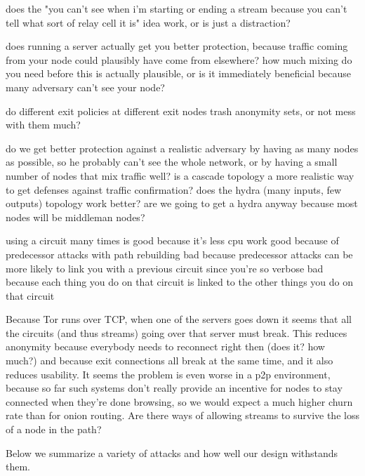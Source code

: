\documentclass[times,10pt,twocolumn]{article}
\begin{document}
does the "you can't see when i'm starting or ending a stream because
you can't tell what sort of relay cell it is" idea work, or is just
a distraction?

does running a server actually get you better protection, because traffic
coming from your node could plausibly have come from elsewhere? how
much mixing do you need before this is actually plausible, or is it
immediately beneficial because many adversary can't see your node?

do different exit policies at different exit nodes trash anonymity sets,
or not mess with them much?

do we get better protection against a realistic adversary by having as
many nodes as possible, so he probably can't see the whole network,
or by having a small number of nodes that mix traffic well? is a
cascade topology a more realistic way to get defenses against traffic
confirmation? does the hydra (many inputs, few outputs) topology work
better? are we going to get a hydra anyway because most nodes will be
middleman nodes?

using a circuit many times is good because it's less cpu work
  good because of predecessor attacks with path rebuilding
  bad because predecessor attacks can be more likely to link you with a
    previous circuit since you're so verbose
  bad because each thing you do on that circuit is linked to the other
    things you do on that circuit

Because Tor runs over TCP, when one of the servers goes down it seems
that all the circuits (and thus streams) going over that server must
break. This reduces anonymity because everybody needs to reconnect
right then (does it? how much?) and because exit connections all break
at the same time, and it also reduces usability. It seems the problem
is even worse in a p2p environment, because so far such systems don't
really provide an incentive for nodes to stay connected when they're
done browsing, so we would expect a much higher churn rate than for
onion routing. Are there ways of allowing streams to survive the loss
of a node in the path?



\label{sec:attacks}

Below we summarize a variety of attacks and how well our design withstands
them.
\end{document}
